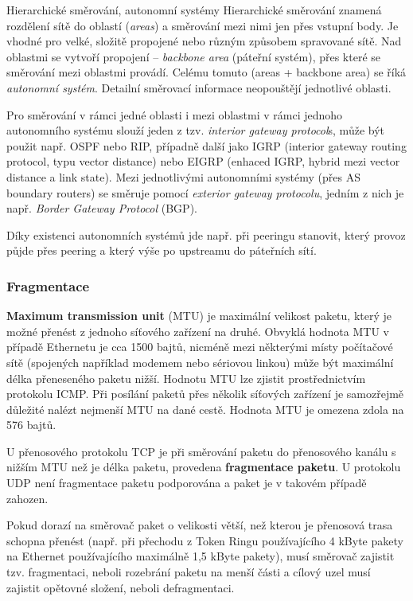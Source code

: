 \begin{obecne}{Hierarchické směrování, autonomní systémy}
Hierarchické směrování znamená rozdělení sítě do oblastí (\emph{areas}) a směrování mezi nimi jen přes vstupní body. Je vhodné pro velké, složitě propojené nebo různým způsobem spravované sítě. Nad oblastmi se vytvoří propojení -- \emph{backbone area} (páteřní systém), přes které se směrování mezi oblastmi provádí. Celému tomuto (areas + backbone area) se říká \emph{autonomní systém}. Detailní směrovací informace neopouštějí jednotlivé oblasti. 

Pro směrování v rámci jedné oblasti i mezi oblastmi v rámci jednoho autonomního systému slouží jeden z tzv. \emph{interior gateway protocol}s, může být použit např. OSPF nebo RIP, případně další jako IGRP (interior gateway routing protocol, typu vector distance) nebo EIGRP (enhaced IGRP, hybrid mezi vector distance a link state). Mezi jednotlivými autonomními systémy (přes AS boundary routers) se směruje pomocí \emph{exterior gateway protocolu}, jedním z nich je např. \emph{Border Gateway Protocol} (BGP).

Díky existenci autonomních systémů jde např. při peeringu stanovit, který provoz půjde přes peering a který výše po upstreamu do páteřních sítí.
\end{obecne}


\subsubsection*{Fragmentace}

\textbf{Maximum transmission unit} (MTU) je maximální velikost paketu, který je možné přenést z jednoho síťového zařízení na druhé. Obvyklá hodnota MTU v případě Ethernetu je cca 1500 bajtů, nicméně mezi některými místy počítačové sítě (spojených například modemem nebo sériovou linkou) může být maximální délka přeneseného paketu nižší. Hodnotu MTU lze zjistit prostřednictvím protokolu ICMP. Při posílání paketů přes několik síťových zařízení je samozřejmě důležité nalézt nejmenší MTU na dané cestě. Hodnota MTU je omezena zdola na 576 bajtů.

U přenosového protokolu TCP je při směrování paketu do přenosového kanálu s nižším MTU než je délka paketu, provedena \textbf{fragmentace paketu}. U protokolu UDP není fragmentace paketu podporována a paket je v takovém případě zahozen.

 Pokud dorazí na směrovač paket o velikosti větší, než kterou je přenosová trasa schopna přenést (např. při přechodu z Token Ringu používajícího 4 kByte pakety na Ethernet používajícího maximálně 1,5 kByte pakety), musí směrovač zajistit tzv. fragmentaci, neboli rozebrání paketu na menší části a cílový uzel musí zajistit opětovné složení, neboli defragmentaci.

